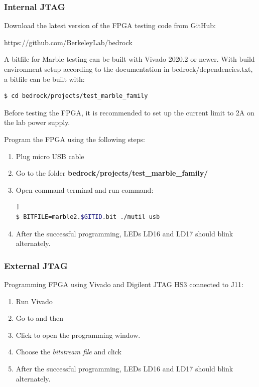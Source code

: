 \documentclass[12pt,oneside,a4]{article}
\begin{document}
\subsubsection{Internal JTAG}
Download the latest version of the FPGA testing code from GitHub:
\begin{leftbar}
https://github.com/BerkeleyLab/bedrock
\end{leftbar}
A bitfile for Marble testing can be built with Vivado 2020.2 or newer.  With build environment setup
according to the documentation in bedrock/dependencies.txt, a bitfile can be built with:
	\begin{lstlisting}[backgroundcolor = \color{Gainsboro}, language=bash, frame=none]
$ cd bedrock/projects/test_marble_family
	\end{lstlisting}

\begin{leftbar}
Before testing the FPGA, it is recommended to set up the current limit to 2A on the lab power supply.
\end{leftbar}

Program the FPGA using the following steps:
\begin{enumerate}
	\item Plug micro USB cable
	\item Go to the folder \textbf{bedrock/projects/test\_marble\_family/}
	\item Open command terminal and run command:
	\begin{lstlisting}[backgroundcolor = \color{Gainsboro}, language=bash, frame=none]]
$ BITFILE=marble2.$GITID.bit ./mutil usb
	\end{lstlisting}
	\item After the successful programming, LEDs LD16 and LD17 should blink alternately.
\end{enumerate}

\subsubsection{External JTAG}
Programming FPGA using Vivado and Digilent JTAG HS3 connected to J11:
\begin{enumerate}
		\item Run Vivado
		\item Go to  and then  
		\item Click  to open the programming window.
		\item Choose the \textit{bitstream file} and click 
		\item After the successful programming, LEDs LD16 and LD17 should blink alternately.
\end{enumerate}
\end{document}
